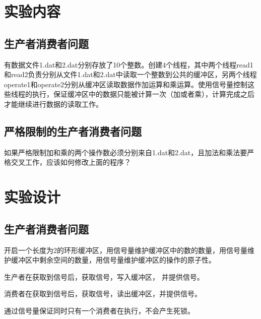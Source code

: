 \documentclass{ctexrep}
\begin{document}
\section{实验内容}
\subsection{生产者消费者问题}
有数据文件1.dat和2.dat分别存放了10个整数。创建4个线程，其中两个线程read1和read2负责分别从文件1.dat和2.dat中读取一个整数到公共的缓冲区，另两个线程operate1和operate2分别从缓冲区读取数据作加运算和乘运算。使用信号量控制这些线程的执行，保证缓冲区中的数据只能被计算一次（加或者乘），计算完成之后才能继续进行数据的读取工作。

\subsection{严格限制的生产者消费者问题}
如果严格限制加和乘的两个操作数必须分别来自1.dat和2.dat，且加法和乘法要严格交叉工作，应该如何修改上面的程序？

\section{实验设计}

\subsection{生产者消费者问题}

开启一个长度为2的环形缓冲区，用信号量维护缓冲区中的数的数量，用信号量维护缓冲区中剩余空间的数量，用信号量维护缓冲区的操作的原子性。

生产者在获取到信号后，获取信号，写入缓冲区， 并提供信号。

消费者在获取到信号后，获取信号，读出缓冲区，并提供信号。

通过信号量保证同时只有一个消费者在执行，不会产生死锁。
\end{document}
